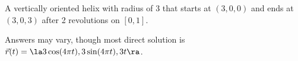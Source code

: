 {A vertically oriented helix with radius of 3 that starts at $(3,0,0)$ and ends at $(3,0,3)$ after 2 revolutions on $[0,1]$. 
}
{
Answers may vary, though most direct solution is\\
$\vec r(t) = \la 3\cos (4\pi t),3\sin (4\pi t),3t\ra $.

}

